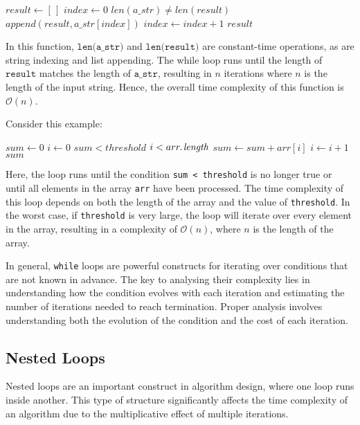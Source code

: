 \begin{codebox}
    \li $result \gets [\,]$ 
    \li $index \gets 0$
    \li \While $len(a\_str) \neq len(result)$ \Do
    \li     $append(result, a\_str[index])$
    \li     $index \gets index + 1$
        \End
    \li \Return $result$
\end{codebox}

In this function, $\texttt{len(a\_str)}$ and $\texttt{len(result)}$ are constant-time operations, as are string indexing and list appending. The while loop runs until the length of $\texttt{result}$ matches the length of $\texttt{a\_str}$, resulting in $n$ iterations where $n$ is the length of the input string. Hence, the overall time complexity of this function is $\mathcal{O}(n)$.

Consider this example:

\begin{codebox}
    \li $sum \gets 0$
    \li $i \gets 0$
    \li \While $sum < threshold$  $i < \attrib{arr}{length}$ \Do
    \li     $sum \gets sum + arr[i]$
    \li     $i \gets i + 1$
        \End
    \li \Return $sum$
\end{codebox}

Here, the loop runs until the condition \texttt{sum < threshold} is no longer true or until all elements in the array \texttt{arr} have been processed. The time complexity of this loop depends on both the length of the array and the value of \texttt{threshold}. In the worst case, if \texttt{threshold} is very large, the loop will iterate over every element in the array, resulting in a complexity of $\mathcal{O}(n)$, where $n$ is the length of the array.

In general, \texttt{while} loops are powerful constructs for iterating over conditions that are not known in advance. The key to analysing their complexity lies in understanding how the condition evolves with each iteration and estimating the number of iterations needed to reach termination. Proper analysis involves understanding both the evolution of the condition and the cost of each iteration.

\subsection*{Nested Loops}

Nested loops are an important construct in algorithm design, where one loop runs inside another. This type of structure significantly affects the time complexity of an algorithm due to the multiplicative effect of multiple iterations.



